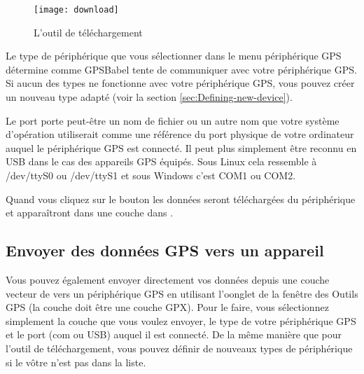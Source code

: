 \begin{figure}[ht]
   \begin{center}
\texttt{[image: download]}
\caption{L'outil de téléchargement \nixcaption}\label{figure_download}
   \end{center}
\end{figure}

Le type de périphérique que vous sélectionner dans le menu périphérique GPS détermine comme GPSBabel tente de communiquer avec votre périphérique GPS.
Si aucun des types ne fonctionne avec votre périphérique GPS, vous pouvez créer un nouveau type adapté (voir la section \ref{sec:Defining-new-device}).

Le port porte peut-être un nom de fichier ou un autre nom que votre système d'opération utiliserait comme une référence du port physique de votre ordinateur auquel le périphérique GPS est connecté. Il peut plus simplement être reconnu en USB dans le cas des appareils GPS équipés.
\nix Sous Linux cela ressemble à /dev/ttyS0 ou /dev/ttyS1  et sous \win Windows c'est COM1 ou COM2.

Quand vous cliquez sur le bouton  les données seront téléchargées du périphérique et apparaîtront dans une couche dans \qg.

\subsection{Envoyer des données GPS vers un appareil}

Vous pouvez également envoyer directement vos données depuis une couche vecteur de \qg vers un périphérique GPS en utilisant l'oonglet  de la fenêtre des Outils GPS (la couche doit être une couche GPX). Pour le faire, vous sélectionnez simplement la couche que vous voulez envoyer, le type de votre périphérique GPS et le port (com ou USB) auquel il est connecté.
De la même manière que pour l'outil de téléchargement, vous pouvez définir de nouveaux types de périphérique si le vôtre n'est pas dans la liste.

